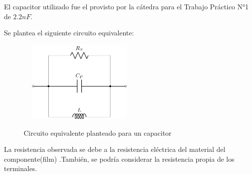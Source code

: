 El capacitor utilizado fue el provisto por la cátedra para el Trabajo Práctico N°1 de $2.2nF$.
\par
Se plantea el siguiente circuito equivalente:

\begin{figure}[H]
\centering
\includegraphics[width=6cm,height=4cm]{Ejercicio_1(Germo)/Circuitos/circuito_equivalente_capacitor_todoparalelo.pdf}
\label{fig:circuito_equivalente_capacitor_todoparalelo}
\caption{Circuito equivalente planteado para un capacitor}
\end{figure}
La resistencia observada se debe a la resistencia eléctrica del material del componente(film) .También, se podría considerar la resistencia propia de los terminales. \par

